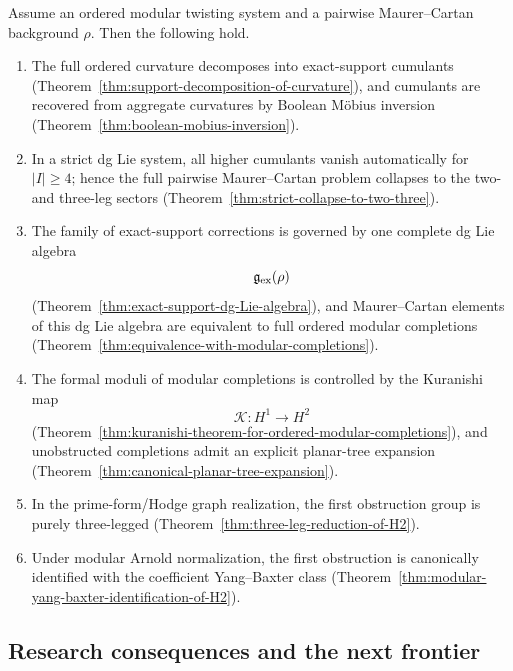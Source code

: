 \begin{theorem}
\label{thm:theorematic-core}
Assume an ordered modular twisting system and a pairwise Maurer--Cartan background $\rho$.
Then the following hold.

\begin{enumerate}
\item
The full ordered curvature decomposes into exact-support cumulants
(Theorem~\ref{thm:support-decomposition-of-curvature}), and cumulants are recovered from
aggregate curvatures by Boolean M\"obius inversion
(Theorem~\ref{thm:boolean-mobius-inversion}).

\item
In a strict dg Lie system, all higher cumulants vanish automatically for $|I|\ge 4$; hence
the full pairwise Maurer--Cartan problem collapses to the two- and three-leg sectors
(Theorem~\ref{thm:strict-collapse-to-two-three}).

\item
The family of exact-support corrections is governed by one complete dg Lie algebra
\[
\mathfrak g_{\mathrm{ex}}(\rho)
\]
(Theorem~\ref{thm:exact-support-dg-Lie-algebra}), and Maurer--Cartan elements of this dg Lie algebra
are equivalent to full ordered modular completions (Theorem~\ref{thm:equivalence-with-modular-completions}).

\item
The formal moduli of modular completions is controlled by the Kuranishi map
\[
\mathcal K\colon H^1\to H^2
\]
(Theorem~\ref{thm:kuranishi-theorem-for-ordered-modular-completions}), and unobstructed completions
admit an explicit planar-tree expansion
(Theorem~\ref{thm:canonical-planar-tree-expansion}).

\item
In the prime-form/Hodge graph realization, the first obstruction group is purely three-legged
(Theorem~\ref{thm:three-leg-reduction-of-H2}).

\item
Under modular Arnold normalization, the first obstruction is canonically identified with the
coefficient Yang--Baxter class
(Theorem~\ref{thm:modular-yang-baxter-identification-of-H2}).
\end{enumerate}
\end{theorem}

\subsection{Research consequences and the next frontier}

